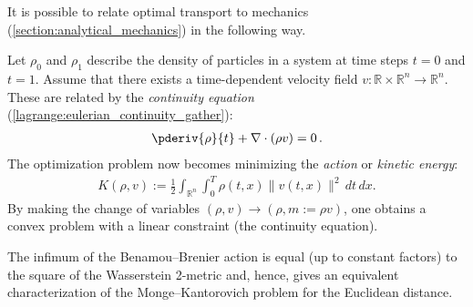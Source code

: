     It is possible to relate optimal transport to mechanics (\cref{section:analytical_mechanics}) in the following way.
    \begin{method}
        Let $\rho_0$ and $\rho_1$ describe the density of particles in a system at time steps $t=0$ and $t=1$. Assume that there exists a time-dependent velocity field $v:\mathbb{R}\times\mathbb{R}^n\rightarrow\mathbb{R}^n$. These are related by the \textit{continuity equation} (\cref{lagrange:eulerian_continuity_gather}):
        \begin{gather}
            \pderiv{\rho}{t} + \nabla\cdot(\rho v) = 0\,.
        \end{gather}
        The optimization problem now becomes minimizing the \textit{action} or \textit{kinetic energy}:
        \begin{gather}
            K(\rho,v) := \frac{1}{2}\int_{\mathbb{R}^n}\int_0^T\rho(t,x)\|v(t,x)\|^2\,dt\,dx.
        \end{gather}
        By making the change of variables $(\rho,v)\longrightarrow(\rho,m:=\rho v)$, one obtains a convex problem with a linear constraint (the continuity equation).
    \end{method}
    \begin{property}
        The infimum of the Benamou--Brenier action is equal (up to constant factors) to the square of the Wasserstein 2-metric and, hence, gives an equivalent characterization of the Monge--Kantorovich problem for the Euclidean distance.
    \end{property}

\section{}

